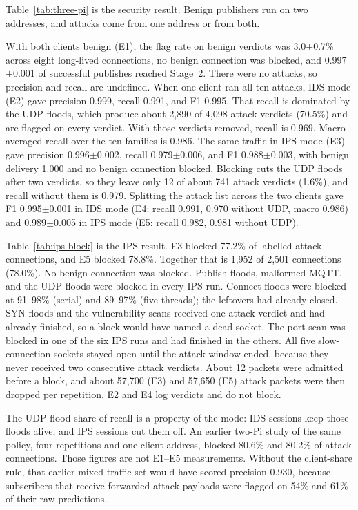 \documentclass[journal]{IEEEtran}
\begin{document}
Table~\ref{tab:three-pi} is the security result. Benign publishers run on two addresses, and attacks come from one address or from both.

With both clients benign (E1), the flag rate on benign verdicts was 3.0$\pm$0.7\% across eight long-lived connections, no benign connection was blocked, and 0.997$\pm$0.001 of successful publishes reached Stage~2. There were no attacks, so precision and recall are undefined. When one client ran all ten attacks, IDS mode (E2) gave precision 0.999, recall 0.991, and F1 0.995. That recall is dominated by the UDP floods, which produce about 2,890 of 4,098 attack verdicts (70.5\%) and are flagged on every verdict. With those verdicts removed, recall is 0.969. Macro-averaged recall over the ten families is 0.986. The same traffic in IPS mode (E3) gave precision 0.996$\pm$0.002, recall 0.979$\pm$0.006, and F1 0.988$\pm$0.003, with benign delivery 1.000 and no benign connection blocked. Blocking cuts the UDP floods after two verdicts, so they leave only 12 of about 741 attack verdicts (1.6\%), and recall without them is 0.979. Splitting the attack list across the two clients gave F1 0.995$\pm$0.001 in IDS mode (E4: recall 0.991, 0.970 without UDP, macro 0.986) and 0.989$\pm$0.005 in IPS mode (E5: recall 0.982, 0.981 without UDP).

Table~\ref{tab:ips-block} is the IPS result. E3 blocked 77.2\% of labelled attack connections, and E5 blocked 78.8\%. Together that is 1,952 of 2,501 connections (78.0\%). No benign connection was blocked. Publish floods, malformed MQTT, and the UDP floods were blocked in every IPS run. Connect floods were blocked at 91--98\% (serial) and 89--97\% (five threads); the leftovers had already closed. SYN floods and the vulnerability scans received one attack verdict and had already finished, so a block would have named a dead socket. The port scan was blocked in one of the six IPS runs and had finished in the others. All five slow-connection sockets stayed open until the attack window ended, because they never received two consecutive attack verdicts. About 12 packets were admitted before a block, and about 57,700 (E3) and 57,650 (E5) attack packets were then dropped per repetition. E2 and E4 log verdicts and do not block.

The UDP-flood share of recall is a property of the mode: IDS sessions keep those floods alive, and IPS sessions cut them off. An earlier two-Pi study of the same policy, four repetitions and one client address, blocked 80.6\% and 80.2\% of attack connections. Those figures are not E1--E5 measurements. Without the client-share rule, that earlier mixed-traffic set would have scored precision 0.930, because subscribers that receive forwarded attack payloads were flagged on 54\% and 61\% of their raw predictions.
\end{document}
